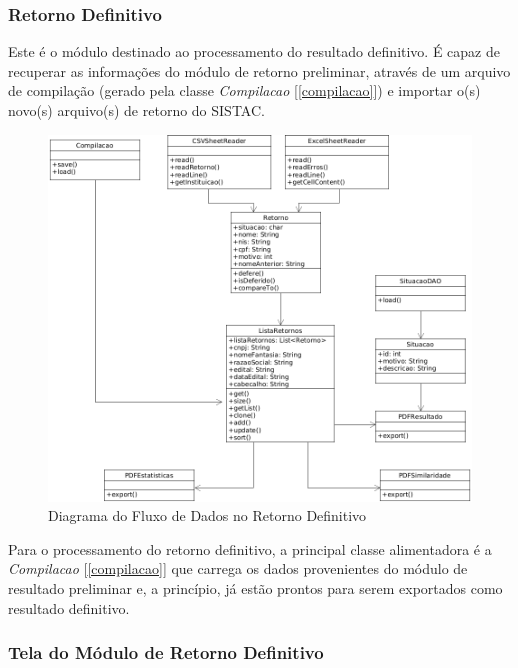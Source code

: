 \documentclass[
	12pt,			%
	openright,		%
	oneside,	
	a4paper,		%
	english,		%
	brazil			%
]{abntex2/abntex2}  %
\begin{document}
				\subsubsection{Retorno Definitivo} \label{retorno-definitivo}
	
					Este é o módulo destinado ao processamento do resultado definitivo. É capaz de recuperar as informações do módulo de retorno preliminar, através de um arquivo de compilação (gerado pela classe \textit{Compilacao} [\ref{compilacao}]) e importar o(s) novo(s) arquivo(s) de retorno do SISTAC.

					\begin{figure}[ht]
						\begin{center}
							
							\caption{Diagrama do Fluxo de Dados no Retorno Definitivo}
							\includegraphics[scale=0.5]{img/retorno-def-uml}
							
						\end{center}
					\end{figure}
	
					Para o processamento do retorno definitivo, a principal classe alimentadora é a \textit{Compilacao} [\ref{compilacao}] que carrega os dados provenientes do módulo de resultado preliminar e, a princípio, já estão prontos para serem exportados como resultado definitivo.
	
				\subsubsection{Tela do Módulo de Retorno Definitivo}
	
\end{document}
